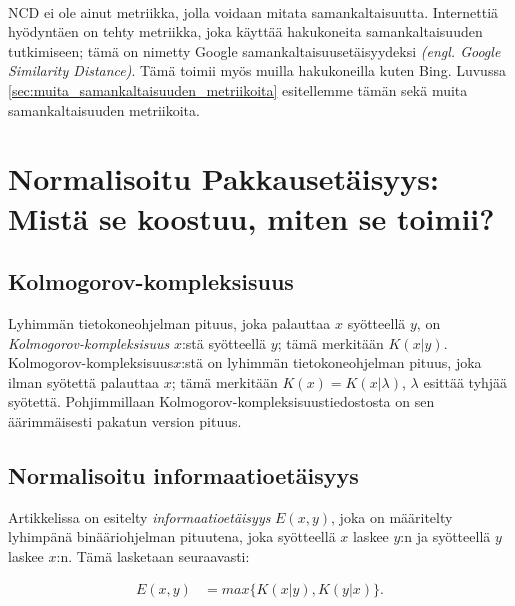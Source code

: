 \documentclass[12pt,finnish,draft]{tktltiki2}
\theoremstyle{definition}
\theoremstyle{remark}
\newcommand{\engl}[1]{\emph{(engl. #1)}}
\newcommand{\kolmogorov}{Kolmogorov-kompleksisuus}
\begin{document}

\paragraph{} %
\label{par:intro-5}
  NCD ei ole ainut metriikka, jolla voidaan mitata samankaltaisuutta. Internettiä hyödyntäen on tehty metriikka, joka käyttää hakukoneita samankaltaisuuden tutkimiseen; tämä on nimetty Google samankaltaisuusetäisyydeksi \engl{Google Similarity Distance}. Tämä toimii myös muilla hakukoneilla kuten Bing. Luvussa \ref{sec:muita_samankaltaisuuden_metriikoita} esitellemme tämän sekä muita samankaltaisuuden metriikoita.

\pagebreak


\section{Normalisoitu Pakkausetäisyys: Mistä se koostuu, miten se toimii?} %
\label{sec:normalisoitu_pakkauset_isyys}
  \subsection{\kolmogorov} %
\label{sub:kolmogorov_kompleksisuus}

  Lyhimmän tietokoneohjelman pituus, joka palauttaa $x$ syötteellä $y$, on \emph{\kolmogorov} $x$:stä syötteellä $y$; tämä merkitään $K(x|y)$. \kolmogorov $x$:stä on lyhimmän tietokoneohjelman pituus, joka ilman syötettä palauttaa $x$; tämä merkitään $K(x)=K(x|\lambda)$, $\lambda$ esittää tyhjää syötettä. Pohjimmillaan \kolmogorov tiedostosta on sen äärimmäisesti pakatun version pituus.

\subsection{Normalisoitu informaatioetäisyys} %
\label{sub:normalisoitu_informaatioet_isyys}

  Artikkelissa \cite{CV05} on esitelty \emph{informaatioetäisyys} $E(x,y)$, joka on määritelty lyhimpänä binääriohjelman pituutena, joka syötteellä $x$ laskee $y$:n ja syötteellä $y$ laskee $x$:n. Tämä lasketaan seuraavasti:

  \begin{align}
    E(x,y) &= max\{K(x|y),K(y|x)\}.
  \end{align}
\end{document}
